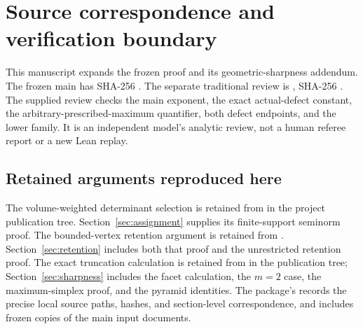 \appendix
\section{Source correspondence and verification boundary}
\label{app:sources}
This manuscript expands the frozen proof
and its geometric-sharpness addendum. The frozen main has SHA-256
.
The separate traditional review is
,
SHA-256
.
The supplied review checks the main exponent, the exact actual-defect
constant, the arbitrary-prescribed-maximum quantifier, both defect
endpoints, and the lower family. It is an independent model's analytic
review, not a human referee report or a new Lean replay.

\subsection{Retained arguments reproduced here}
The volume-weighted determinant selection is retained from
in the project publication tree. Section~\ref{sec:assignment} supplies its
finite-support seminorm proof. The bounded-vertex retention argument is
retained from
.
Section~\ref{sec:retention} includes both that proof and the unrestricted
retention proof. The exact truncation calculation is retained from
 in the publication
tree; Section~\ref{sec:sharpness} includes the facet calculation, the
$m=2$ case, the maximum-simplex proof, and the pyramid identities.
The package's  records the precise local source
paths, hashes, and section-level correspondence, and includes frozen
copies of the main input documents.

